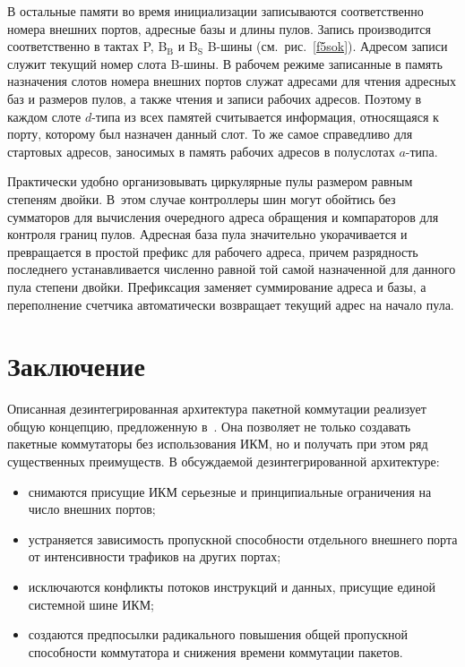 \begin{multicols}{2}
    В остальные памяти во время инициализации записываются соответственно номера
внешних портов, адресные базы и длины пулов. Запись производится соответственно в тактах
P, B$_{\mathrm{B}}$ и B$_{\mathrm{S}}$ B-шины (см.\ рис.~\ref{f5sok}). Адресом записи служит текущий номер слота 
B-ши\-ны. В рабочем режиме записанные в память назначения слотов номера внешних портов
служат адресами для чтения адресных баз и размеров пулов, а также чтения и записи рабочих
адресов. Поэтому в каждом слоте $d$-типа из всех памятей считывается информация,
относящаяся к порту, которому был назначен данный слот. То же самое справедливо для
стартовых адресов, заносимых в память рабочих адресов в полуслотах $a$-типа.
{

}

    Практически удобно организовывать циркулярные пулы размером равным степеням
двойки. В~этом случае контроллеры шин могут обойтись без сумматоров для вычисления
очередного адреса обращения и компараторов для контроля границ пулов. Адресная база пула
значительно укорачивается и превращается в простой префикс для рабочего адреса, причем
разрядность последнего уста\-нав\-ли\-ва\-ет\-ся численно равной той самой назначенной для данного
пула степени двойки. Префиксация заменяет суммирование адреса и базы, а переполнение
счетчика автоматически возвращает текущий адрес на начало пула.
\section{Заключение}

  Описанная дезинтегрированная архитектура пакетной коммутации реализует общую
концепцию, предложенную в~\cite{5sok}. Она позволяет не только создавать пакетные
коммутаторы без использования ИКМ, но и получать при этом ряд существенных преимуществ.
В обсуждаемой дезинтегрированной архитектуре:
    \begin{itemize}
\item снимаются присущие ИКМ серьезные и принципиальные ограничения на число
внешних портов;
\item устраняется зависимость пропускной способности отдельного внешнего порта от
интенсивности трафиков на других портах;
\item исключаются конфликты потоков инструкций и данных, присущие единой системной
шине ИКМ;
\item создаются предпосылки радикального повышения общей пропускной способности
коммутатора и снижения времени коммутации пакетов.
\end{itemize}


\end{multicols}
